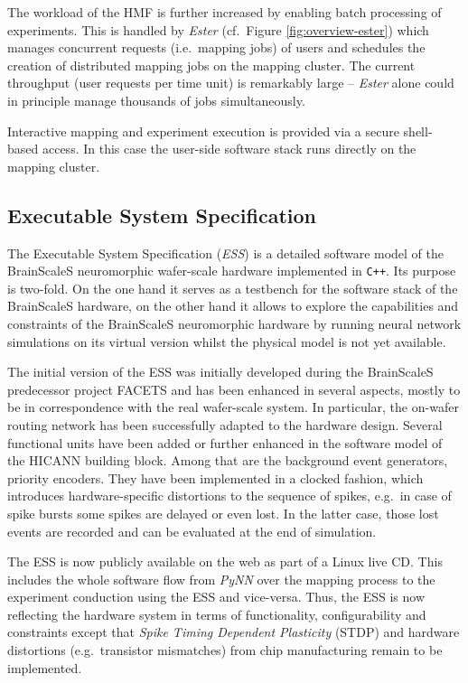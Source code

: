 \documentclass[12pt,oneside]{scrartcl}
\begin{document}
The workload of the HMF is further increased by enabling batch processing of experiments.
%
This is handled by \emph{Ester} (cf.\ Figure \ref{fig:overview-ester}) which manages concurrent requests (i.e.\ mapping jobs) of users and schedules the creation of distributed mapping jobs on the mapping cluster.
%
The current throughput (user requests per time unit) is remarkably large -- \emph{Ester} alone could in principle manage thousands of jobs simultaneously.

Interactive mapping and experiment execution is provided via a secure shell-based access.
%
In this case the user-side software stack runs directly on the mapping cluster.

\subsection*{Executable System Specification}

The Executable System Specification (\emph{ESS}) is a detailed software model of the BrainScaleS neuromorphic wafer-scale hardware implemented in \texttt{C++}.
%
Its purpose is two-fold.
%
On the one hand it serves as a testbench for the software stack of the BrainScaleS hardware, on the other hand it allows to explore the capabilities and constraints of the BrainScaleS neuromorphic hardware by running neural network simulations on its virtual version whilst the physical model is not yet available.

The initial version of the ESS was initially developed during the BrainScaleS predecessor project FACETS and has been enhanced in several aspects, mostly to be in correspondence with the real wafer-scale system.
%
In particular, the on-wafer routing network has been successfully adapted to the hardware design.
%
Several functional units have been added or further enhanced in the software model of the HICANN building block.
%
Among that are the background event generators, priority encoders.
%
They have been implemented in a clocked fashion, which introduces hardware-specific distortions to the sequence of spikes, e.g.\ in case of spike bursts some spikes are delayed or even lost.
%
In the latter case, those lost events are recorded and can be evaluated at the end of simulation.

The ESS is now publicly available on the web as part of a Linux live CD.
This includes the whole software flow from \emph{PyNN} over the mapping process to the experiment conduction using the ESS and vice-versa.
%
Thus, the ESS is now reflecting the hardware system in terms of functionality, configurability and constraints except that \emph{Spike Timing Dependent Plasticity} (STDP) and hardware distortions (e.g.\ transistor mismatches) from chip manufacturing remain to be implemented.
\end{document}
